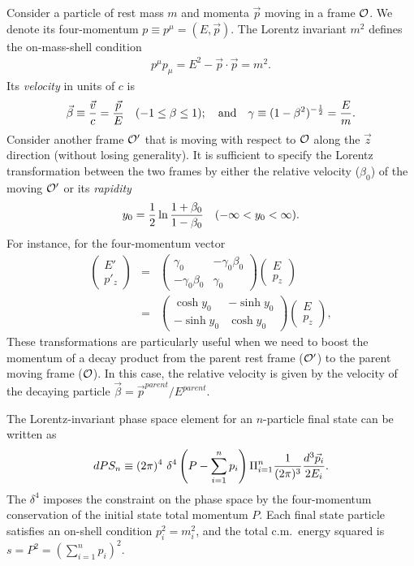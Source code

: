 \documentclass[12pt,prd,aps,floats,preprintnumbers,preprint,superscriptaddress,floatfix,nofootinbib]{revtex4}
\def\vp{{\vec p}}
\def\cO{{\cal O}}
\def\be{\begin{equation}}
\def\ee{\end{equation}}
\def\bea{\begin{eqnarray}}
\def\eea{\end{eqnarray}}
\begin{document}
Consider a particle of  rest mass $m$ and momenta $\vp$ 
moving in a frame $\cO$. 
We denote its four-momentum $p\equiv p^\mu=(E,\vp)$. 
The Lorentz invariant $m^2$ defines the on-mass-shell condition 
\bea
p^\mu p_\mu = E^2- \vec p \cdot \vec p = m^2.
\eea
Its {\it velocity} in units of $c$ is 
\bea
\vec\beta \equiv {\vec v\over c} = {\vec p\over E}\quad (-1 \le \beta \le 1);\quad
{\rm and}\quad \gamma \equiv (1-\beta^2)^{-{1\over2}} = {E\over m} .
\eea
Consider another frame $\cO'$ that is moving with respect to $\cO$ 
along the $\vec z$ direction (without losing generality). It 
is sufficient to specify the Lorentz transformation between the two frames
by either the relative  velocity  ($\beta_0$) of the moving $\cO'$
or its {\it rapidity}
\bea
\label{rapid}
y_0={1\over 2}\ln{1+\beta_0 \over 1-\beta_0 }\quad (-\infty < y_0 < \infty).
\eea
%
For instance, for the four-momentum vector
\bea
\nonumber
\label{trans}
\left(  
\begin{array}{l}
E' \\
 p'_z
\end{array}
\right)  & = &
\left(  
\begin{array}{ll}
\gamma_0 & -\gamma_0 \beta_0 \\
-\gamma_0 \beta_0 & \gamma_0
\end{array} 
\right) 
\left(  
\begin{array}{l}
E \\
 p_z
\end{array}
\right) \\
& = &
\left(  
\begin{array}{ll}
\cosh y_0 & -\sinh y_0 \\
-\sinh y_0 & \cosh y_0
\end{array}
\right)
\left(  
\begin{array}{l}
E \\
 p_z
\end{array}
\right),
\label{lor}
\eea
These transformations are particularly
useful when we need to boost the momentum of a decay product from the
parent rest frame ($\cO'$) to the parent moving frame ($\cO$). In this case,
the relative velocity is given by the velocity of the decaying particle
$\vec\beta = \vp^{parent}/E^{parent}$.

The Lorentz-invariant phase space element  for an $n$-particle final state 
can be written as 
\be
dPS_n \equiv (2\pi)^4\ 
\delta^4\left(P-\sum_{i=1}^n p_i \right) \Pi_{i=1}^n {1\over (2\pi)^3}
{d^3\vec p_i\over 2E_i} .
\ee
The $\delta^4$ imposes the constraint on the phase space by the four-momentum
conservation of the initial state total momentum $P$. 
Each final state particle satisfies an on-shell condition $p_i^2 = m_i^2$,
and the total c.m.~energy squared is $s=P^2 =\left(\sum_{i=1}^n p_i \right)^2.$
\end{document}
